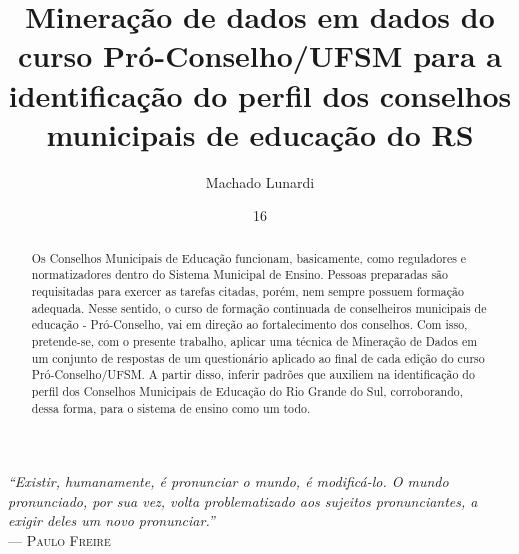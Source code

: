 \documentclass[tg]{mdtufsm}
\title{Mineração de dados em dados do curso Pró-Conselho/UFSM para a identificação do perfil dos conselhos municipais de educação do RS}
\author{Machado Lunardi}{Gabriel}
\institute{Centro de Tecnologia}
\date{16}{Outubro}{2014}
\begin{document}
\maketitle
\setlength{\baselineskip}{1.5\baselineskip}

\clearpage
\begin{flushright}
	\mbox{}\vfill
	{\sffamily\itshape
		``Existir, humanamente, é pronunciar o mundo, é modificá-lo. O mundo pronunciado, por sua vez, volta problematizado aos sujeitos pronunciantes, a exigir deles um novo pronunciar.'' \\ }
	--- \textsc{Paulo Freire}
\end{flushright}

\begin{abstract}
	
	Os Conselhos Municipais de Educação funcionam, basicamente, como reguladores e normatizadores dentro do Sistema Municipal de Ensino. Pessoas preparadas são requisitadas para exercer as tarefas citadas, porém, nem sempre possuem formação adequada. Nesse sentido, o curso de formação continuada de conselheiros municipais de educação - Pró-Conselho, vai em direção ao fortalecimento dos conselhos. Com isso, pretende-se, com o presente trabalho, aplicar uma técnica de Mineração de Dados em um conjunto de respostas de um questionário aplicado ao final de cada edição do curso Pró-Conselho/UFSM. A partir disso, inferir padrões que auxiliem na identificação do perfil dos Conselhos Municipais de Educação do Rio Grande do Sul, corroborando, dessa forma, para o sistema de ensino como um todo.
	
\end{abstract}

	
\end{document}
